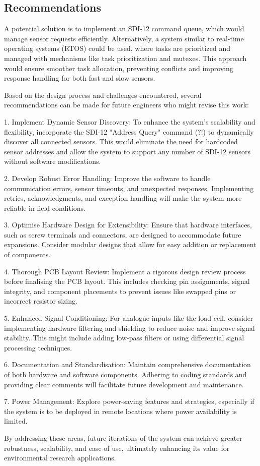 \subsection{Recommendations}

A potential solution is to implement an SDI-12 command queue, which would manage sensor requests efficiently. Alternatively, a system similar to real-time operating systems (RTOS) could be used, where tasks are prioritized and managed with mechanisms like task prioritization and mutexes. This approach would ensure smoother task allocation, preventing conflicts and improving response handling for both fast and slow sensors.

Based on the design process and challenges encountered, several recommendations can be made for future engineers who might revise this work:

1. Implement Dynamic Sensor Discovery: To enhance the system's scalability and flexibility, incorporate the SDI-12 "Address Query" command (?!) to dynamically discover all connected sensors. This would eliminate the need for hardcoded sensor addresses and allow the system to support any number of SDI-12 sensors without software modifications.

2. Develop Robust Error Handling: Improve the software to handle communication errors, sensor timeouts, and unexpected responses. Implementing retries, acknowledgments, and exception handling will make the system more reliable in field conditions.

3. Optimise Hardware Design for Extensibility: Ensure that hardware interfaces, such as screw terminals and connectors, are designed to accommodate future expansions. Consider modular designs that allow for easy addition or replacement of components.

4. Thorough PCB Layout Review: Implement a rigorous design review process before finalising the PCB layout. This includes checking pin assignments, signal integrity, and component placements to prevent issues like swapped pins or incorrect resistor sizing.

5. Enhanced Signal Conditioning: For analogue inputs like the load cell, consider implementing hardware filtering and shielding to reduce noise and improve signal stability. This might include adding low-pass filters or using differential signal processing techniques.

6. Documentation and Standardisation: Maintain comprehensive documentation of both hardware and software components. Adhering to coding standards and providing clear comments will facilitate future development and maintenance.

7. Power Management: Explore power-saving features and strategies, especially if the system is to be deployed in remote locations where power availability is limited.

By addressing these areas, future iterations of the system can achieve greater robustness, scalability, and ease of use, ultimately enhancing its value for environmental research applications.